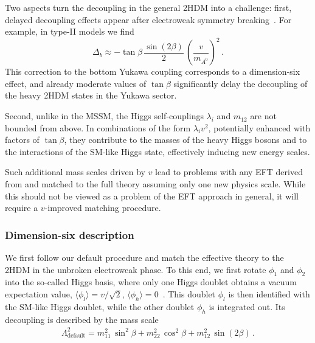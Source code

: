 \newparagraph
%
Two aspects turn the decoupling in the general 2HDM into a challenge:
first, delayed decoupling effects appear after electroweak symmetry
breaking~\cite{Haber:2000kq}. For example, in type-II models we
find~\cite{Lopez-Val:2013yba}
%
\begin{equation}
  \Delta_b
  \approx - \tan \beta \, \frac{\sin (2\beta)} 2 \, \left( \frac{v}{m_{A^0}} \right)^2 \,.
  \label{eq:validity_2hdm_delayed}
\end{equation}
%
This correction to the bottom Yukawa coupling corresponds to a
dimension-six effect, and already moderate values of $\tan \beta$
significantly delay the decoupling of the heavy 2HDM states in the
Yukawa sector.

Second, unlike in the MSSM, the Higgs self-couplings $\lambda_i$ and
$m_{12}$ are not bounded from above. In combinations of the form
$\lambda_i v^2$, potentially enhanced with factors of $\tan \beta$,
they contribute to the masses of the heavy Higgs bosons and to the
interactions of the SM-like Higgs state, effectively inducing new
energy scales.

Such additional mass scales driven by $v$ lead to problems with any
EFT derived from and matched to the full theory assuming only one new
physics scale. While this should not be viewed as a problem of the EFT
approach in general, it will require a $v$-improved matching
procedure.



\subsubsection{Dimension-six description}

We first follow our default procedure and match the effective theory
to the 2HDM in the unbroken electroweak phase. To this end, we first
rotate $\phi_1$ and $\phi_2$ into the so-called Higgs basis, where
only one Higgs doublet obtains a vacuum expectation value,
$\langle \phi_l \rangle = v/\sqrt{2}$,
$\langle \phi_h \rangle = 0$~\cite{Glashow:1976nt, Davidson:2005cw}.
This doublet $\phi_l$ is then identified with the SM-like Higgs
doublet, while the other doublet $\phi_h$ is integrated out. Its
decoupling is described by the mass scale
%
\begin{align}
  \Lambda_{\text{default}}^2 = m^2_{11} \, \sin^2 \! \beta + m^2_{22} \, \cos^2 \! \beta + m^2_{12} \, \sin (2\beta) \,.
\end{align}

